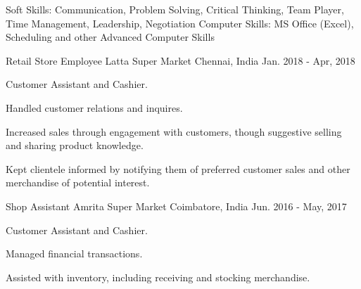 \documentclass[12pt, a4paper]{awesome-cv}
\begin{document}
\makecvheader

\vspace{-1.5ex}
\begin{cventries}
\end{cventries}

\begin{cvskills}
    \cvskill
        {Soft Skills:}
        {Communication, Problem Solving, Critical Thinking, Team Player, Time Management, Leadership, Negotiation}
    \cvskill
        {Computer Skills:}
        {MS Office (Excel), Scheduling and other Advanced Computer Skills}
\end{cvskills}

\begin{cventries}
\cventry
    {Retail Store Employee}
    {Latta Super Market}
    {Chennai, India}
    {Jan. 2018 - Apr, 2018}
    {
      \begin{cvitems}
        \item {Customer Assistant and Cashier.}
        \item {Handled customer relations and inquires.}
        \item {Increased sales through engagement with customers, though suggestive selling and sharing product knowledge.}
        \item {Kept clientele informed by notifying them of preferred customer sales and other merchandise of potential interest.}
      \end{cvitems}
    }
\cventry
    {Shop Assistant}
    {Amrita Super Market}
    {Coimbatore, India}
    {Jun. 2016 - May, 2017}
    {
      \begin{cvitems}
        \item {Customer Assistant and Cashier.}
        \item {Managed financial transactions.}
        \item {Assisted with inventory, including receiving and stocking merchandise.}
      \end{cvitems}
    }
\end{cventries}
\end{document}

